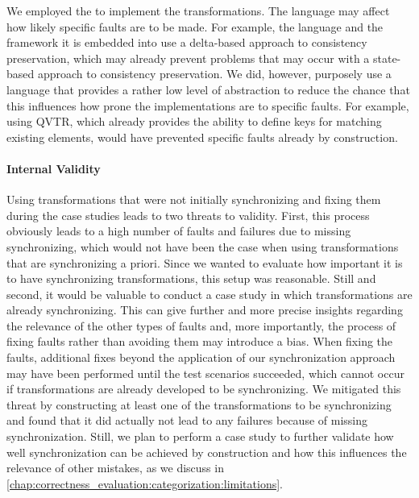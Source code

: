 We employed the \reactionslanguage to implement the transformations.
The language may affect how likely specific faults are to be made.
For example, the language and the \vitruv framework it is embedded into use a delta-based approach to consistency preservation, which may already prevent problems that may occur with a state-based approach to consistency preservation.
We did, however, purposely use a language that provides a rather low level of abstraction to reduce the chance that this influences how prone the implementations are to specific faults.
For example, using \gls{QVTR}, which already provides the ability to define keys for matching existing elements, would have prevented specific faults already by construction.

\paragraph{Internal Validity}

Using transformations that were not initially synchronizing and fixing them during the case studies leads to two threats to validity. 
First, this process obviously leads to a high number of faults and failures due to missing synchronizing, which would not have been the case when using transformations that are synchronizing a priori.
Since we wanted to evaluate how important it is to have synchronizing transformations, this setup was reasonable.
Still and second, it would be valuable to conduct a case study in which transformations are already synchronizing.
This can give further and more precise insights regarding the relevance of the other types of faults and, more importantly, the process of fixing faults rather than avoiding them may introduce a bias.
When fixing the faults, additional fixes beyond the application of our synchronization approach may have been performed until the test scenarios succeeded, which cannot occur if transformations are already developed to be synchronizing.
We mitigated this threat by constructing at least one of the transformations to be synchronizing and found that it did actually not lead to any failures because of missing synchronization.
Still, we plan to perform a case study to further validate how well synchronization can be achieved by construction and how this influences the relevance of other mistakes, as we discuss in \autoref{chap:correctness_evaluation:categorization:limitations}.

